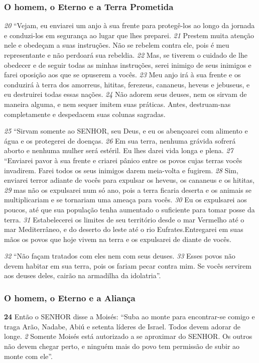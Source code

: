 \subsubsection*{O homem, o Eterno e a Terra Prometida}
\textit{\tiny 20}
“Vejam, eu enviarei um anjo à sua frente para protegê-los ao longo da jornada e
conduzi-los em segurança ao lugar que lhes preparei. 
\textit{\tiny 21}
Prestem muita atenção
nele e obedeçam a suas instruções. Não se rebelem contra ele, pois é meu
representante e não perdoará sua rebeldia. 
\textit{\tiny 22}
Mas, se tiverem o cuidado de lhe
obedecer e de seguir todas as minhas instruções, serei inimigo de seus inimigos e
farei oposição aos que se opuserem a vocês. 
\textit{\tiny 23}
Meu anjo irá à sua frente e os
conduzirá à terra dos amorreus, hititas, ferezeus, cananeus, heveus e jebuseus, e
eu destruirei todas essas nações. 
\textit{\tiny 24}
Não adorem seus deuses, nem os sirvam de
maneira alguma, e nem sequer imitem suas práticas. Antes, destruam-nas
completamente e despedacem suas colunas sagradas.
   
\smallskip
\textit{\tiny 25}
“Sirvam somente ao SENHOR, seu Deus, e eu os abençoarei com alimento e
água e os protegerei de doenças. 
\textit{\tiny 26}
Em sua terra, nenhuma grávida sofrerá
aborto e nenhuma mulher será estéril. Eu lhes darei vida longa e plena.
\textit{\tiny 27}
“Enviarei pavor à sua frente e criarei pânico entre os povos cujas terras vocês
invadirem. Farei todos os seus inimigos darem meia-volta e fugirem. 
\textit{\tiny 28}
Sim,
enviarei terror adiante de vocês para expulsar os heveus, os cananeus e os
hititas, 
\textit{\tiny 29}
mas não os expulsarei num só ano, pois a terra ficaria deserta e os
animais se multiplicariam e se tornariam uma ameaça para vocês. 
\textit{\tiny 30}
Eu os
expulsarei aos poucos, até que sua população tenha aumentado o suficiente para
tomar posse da terra. 
\textit{\tiny 31}
Estabelecerei os limites de seu território desde o mar
Vermelho até o mar Mediterrâneo, e do deserto do leste até o rio Eufrates.Entregarei em suas mãos os povos que hoje vivem na terra e os expulsarei de
diante de vocês.
  
\smallskip
\textit{\tiny 32}
“Não façam tratados com eles nem com seus deuses. 
\textit{\tiny 33}
Esses povos não
devem habitar em sua terra, pois os fariam pecar contra mim. Se vocês servirem
aos deuses deles, cairão na armadilha da idolatria”.

 
\bigskip
\subsubsection*{O homem, o Eterno e a Aliança}
\textbf{\large 24}
 Então o SENHOR disse a Moisés: “Suba ao monte para encontrar-se comigo
e traga Arão, Nadabe, Abiú e setenta líderes de Israel. Todos devem adorar de
longe. 
\textit{\tiny 2} 
Somente Moisés está autorizado a se aproximar do SENHOR. Os outros não
devem chegar perto, e ninguém mais do povo tem permissão de subir ao monte
com ele”. 

